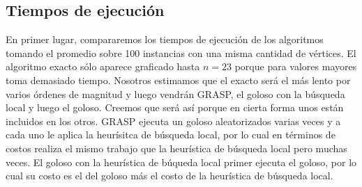 \subsection{Tiempos de ejecución}
En primer lugar, compararemos los tiempos de ejecución de los algoritmos tomando el promedio
sobre 100 instancias con una misma cantidad de vértices. El algoritmo exacto sólo
aparece graficado hasta $n=23$ porque para valores mayores toma demasiado tiempo.
Nosotros estimamos que el exacto será el más lento por varios órdenes de magnitud y luego
vendrán GRASP, el goloso con la búsqueda local y luego el goloso. Creemos que será así
porque en cierta forma unos están incluidos en los otros. GRASP ejecuta un goloso aleatorizados
varias veces y a cada uno le aplica la heurísitca de búsqueda local, por lo cual en términos
de costos realiza el mismo trabajo que la heurística de búsqueda local pero muchas veces.
El goloso con la heurística de búqueda local primer ejecuta el goloso, por lo cual su costo
es el del goloso más el costo de la heurística de búsqueda local.

